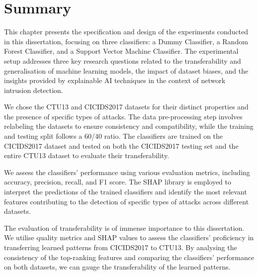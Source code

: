 \section{Summary}\label{sec:Summary}

This chapter presents the specification and design of the experiments conducted in this dissertation, focusing on three classifiers: a Dummy Classifier, a Random Forest Classifier, and a Support Vector Machine Classifier. The experimental setup addresses three key research questions related to the transferability and generalisation of machine learning models, the impact of dataset biases, and the insights provided by explainable AI techniques in the context of network intrusion detection.

We chose the CTU13 and CICIDS2017 datasets for their distinct properties and the presence of specific types of attacks. The data pre-processing step involves relabeling the datasets to ensure consistency and compatibility, while the training and testing split follows a 60/40 ratio. The classifiers are trained on the CICIDS2017 dataset and tested on both the CICIDS2017 testing set and the entire CTU13 dataset to evaluate their transferability.

We assess the classifiers' performance using various evaluation metrics, including accuracy, precision, recall, and F1 score. The SHAP library is employed to interpret the predictions of the trained classifiers and identify the most relevant features contributing to the detection of specific types of attacks across different datasets.

The evaluation of transferability is of immense importance to this dissertation. We utilise quality metrics and SHAP values to assess the classifiers' proficiency in transferring learned patterns from CICIDS2017 to CTU13. By analysing the consistency of the top-ranking features and comparing the classifiers' performance on both datasets, we can gauge the transferability of the learned patterns.